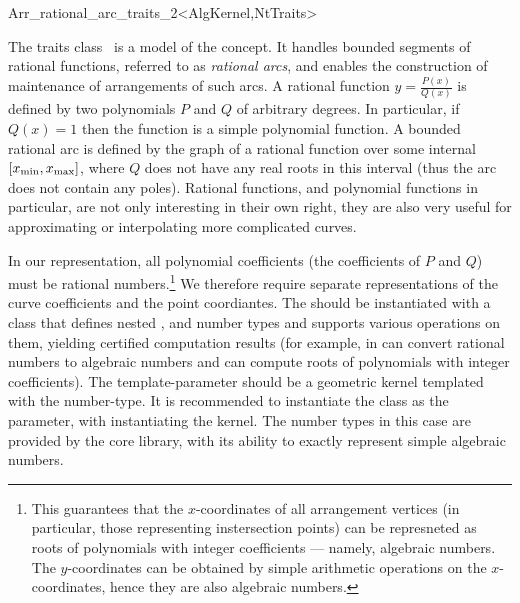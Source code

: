 
\ccRefPageBegin
\begin{ccRefClass}{Arr_rational_arc_traits_2<AlgKernel,NtTraits>}

\ccDefinition

The traits class \ccRefName\ is a model of the 
concept. It handles bounded segments of rational functions, referred to as
{\sl rational arcs}, and enables the construction of maintenance of arrangements
of such arcs. A rational function $y = \frac{P(x)}{Q(x)}$ is defined by two
polynomials $P$ and $Q$ of arbitrary degrees. In particular, if $Q(x) = 1$
then the function is a simple polynomial function. A bounded rational arc is
defined by the graph of a rational function over some internal
$[x_{\rm min}, x_{\rm max}]$, where $Q$ does not have any real roots in this
interval (thus the arc does not contain any poles).
Rational functions, and polynomial functions in particular, are
not only interesting in their own right, they are also very useful
for approximating or interpolating more complicated curves.

In our representation, all polynomial coefficients (the coefficients of $P$
and $Q$) must be rational numbers.\footnote{This guarantees that the
$x$-coordinates of all arrangement vertices (in particular, those
representing instersection points) can be represneted as roots of
polynomials with integer coefficients --- namely, algebraic numbers.
The $y$-coordinates can be obtained by simple arithmetic operations on
the $x$-coordinates, hence they are also algebraic numbers.}
We therefore require separate representations of the curve coefficients and
the point coordiantes. The  should be instantiated with a class
that defines nested ,  and  number
types and supports various operations on them, yielding certified computation
results (for example, in can convert rational numbers to algebraic numbers
and can compute roots of polynomials with integer coefficients).
The  template-parameter should be a geometric kernel templated
with the  number-type. It is recommended to
instantiate the  class as the 
parameter, with  instantiating the kernel.
The number types in this case are provided by the {\sc core} library, with its
ability to exactly represent simple algebraic numbers.


\end{ccRefClass}
